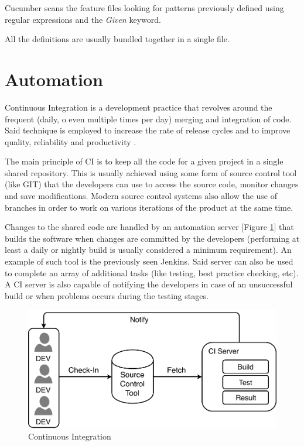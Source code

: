 Cucumber scans the feature files looking for patterns previously defined using regular expressions and the \textit{Given} keyword. 

All the definitions are usually bundled together in a single file.
\section{Automation}

Continuous Integration \cite{CIBook} is a development practice that revolves around the frequent (daily, o even multiple times per day) merging and integration of code. Said technique is employed to increase the rate of release cycles and to improve quality, reliability and productivity \cite{CIArticle}.

The main principle of CI is to keep all the code for a given project in a single shared repository. This is usually achieved using some form of source control tool (like GIT) that the developers can use to access the source code, monitor changes and save modifications. Modern source control systems also allow the use of branches in order to work on various iterations of the product at the same time.

Changes to the shared code are handled by an automation server [Figure \ref{fig:CI}] that builds the software when changes are committed by the developers (performing at least a daily or nightly build is usually considered a minimum requirement). An example of such tool is the previously seen Jenkins. Said server can also be used to complete an array of additional tasks (like testing, best practice checking, etc). A CI server is also capable of notifying the developers in case of an unsuccessful build or when problems occurs during the testing stages.

\begin{figure}[ht]
	\centering
	\includegraphics[scale=0.7]{Images/CI.pdf}
	\caption{Continuous Integration}
	\label{fig:CI}
\end{figure}

